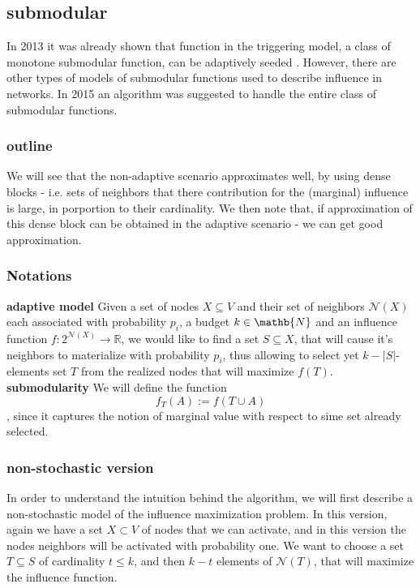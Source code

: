 \subsection{submodular}\label{sec:sub}
In 2013 it was already shown that function in the triggering model, a class of monotone submodular function, can be adaptively seeded \cite{seeman2013adaptive}. However, there are other types of models of submodular functions used to describe influence in networks. In 2015 \cite{badanidiyuru2016locally} an algorithm was suggested to handle the entire class of submodular functions.

\subsubsection{outline}
We will see that the non-adaptive scenario approximates well, by using dense blocks - i.e. sets of neighbors that there contribution for the (marginal) influence is large, in porportion to their cardinality. We then note that, if approximation of this dense block can be obtained in the adaptive scenario - we can get good approximation. 

\subsubsection{Notations}
\textbf{adaptive model} Given a set of nodes $X\subseteq V$ and their set of neighbors $\mathcal{N}(X)$ each associated with probability $p_i$, a budget $k\in\mathb{N}$ and an influence function $f:2^{\mathcal{N}(X)}\rightarrow \mathbb{R}$, we would like to find a set $S\subseteq X$, that will cause it's neighbors to materialize with probability $p_i$, thus allowing to select yet $k-|S|$-elements set $T$ from the realized nodes that will maximize $f(T)$.
\textbf{submodularity}
We will define the function $$f_T(A):=f(T\cup A)$$, since it captures the notion of marginal value with respect to sime set already selected.
 
\subsubsection{non-stochastic version}
In order to understand the intuition behind the algorithm, we will first describe a non-stochastic model of the influence maximization problem. In this version, again we have a set $X\subset V$ of nodes that we can activate, and in this version the nodes neighbors will be activated with probability one. We want to choose a set $T\subseteq S$ of cardinality $t\le k$, and then $k-t$ elements of $\mathcal{N}(T)$, that will maximize the influence function. 

